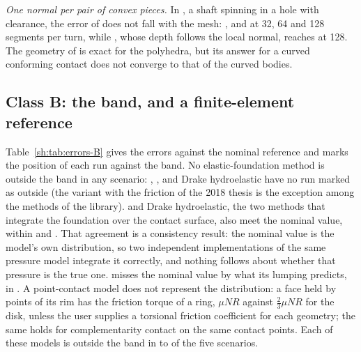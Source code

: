 \emph{One normal per pair of convex pieces.} In , a shaft spinning in a hole with
clearance, the error of  does not fall with the mesh:
,  and
 at 32, 64 and 128 segments per turn, while ,
whose depth follows the local normal, reaches  at 128. The
geometry of  is exact for the polyhedra, but its answer for a curved
conforming contact does not converge to that of the curved bodies.

\subsection{Class B: the band, and a finite-element reference}\label{sh:classB}

Table~\ref{sh:tab:errors-B} gives the errors against the nominal reference and marks the
position of each run against the band. No elastic-foundation method is outside the band in any
scenario: , ,  and Drake hydroelastic have no run
marked as outside (the variant with the friction of the 2018 thesis is the exception among the
methods of the library).  and Drake hydroelastic, the two methods that integrate the
foundation over the contact surface, also meet the nominal value, within
 and . That agreement is a consistency
result: the nominal value is the model's own distribution, so two independent implementations
of the same pressure model integrate it correctly, and nothing follows about whether that
pressure is the true one.  misses the nominal value by what its lumping
predicts,  in . A point-contact model does not represent
the distribution: a face held by points of its rim has the friction torque of a ring,
$\mu N R$ against $\tfrac23\mu N R$ for the disk, unless the user supplies a torsional
friction coefficient for each geometry; the same holds for complementarity contact on the same
contact points. Each of these models is outside the band in
 to  of the five scenarios.

\begin{table}[t]
\caption{Class B: error [\%] against the nominal reference, base variant. Gon: ;
G18: its variant with the friction of the 2018 thesis; Dis: ; Dr-h, Dr-p: Drake hydroelastic and point; Ch-S, Ch-N:
Chrono SMC and NSC; Mj-s, Mj-d: MuJoCo soft and default. Band: in percent of the nominal stop
time. $^\dagger$: outside the band; $^{*}$: undetermined (the sign of the error was not
recorded); unmarked: inside; \textit{nan}: no error value. Native models: results of our
configurations}
\label{sh:tab:errors-B}
\end{table}


